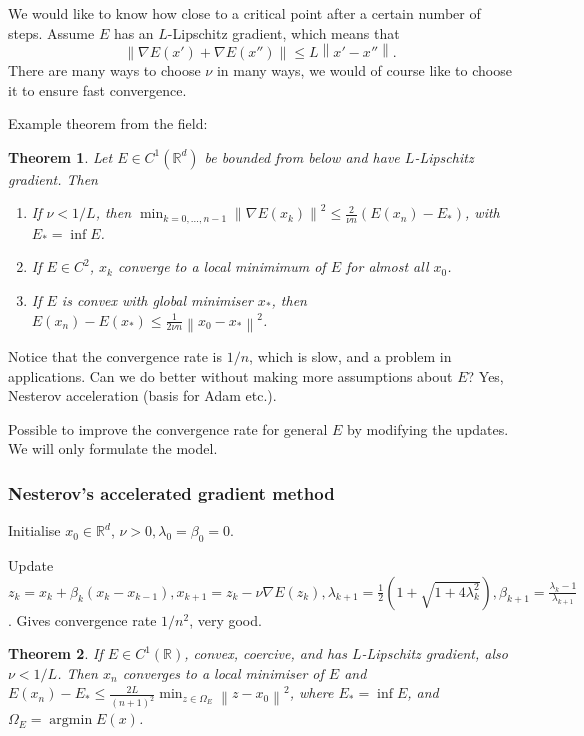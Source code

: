 \documentclass[12pt]{article}
\newtheorem{theorem}{Theorem}[section]
\theoremstyle{definition}
\newcommand{\real}{\mathbb{R}}   %
\DeclareMathOperator{\argmin}{argmin}
\newcommand\norm[1]{\left\lVert#1\right\rVert}
\begin{document}
We would like to know how close to a critical point after a certain number of steps. Assume $E$ has an $L$-Lipschitz gradient, which means that
\begin{equation*}
    \norm{\nabla E(x') + \nabla E(x'')} \leq L \norm{x'-x''}.
\end{equation*}
There are many ways to choose $\nu$ in many ways, we would of course like to choose it to ensure fast convergence. 

Example theorem from the field:
\begin{theorem}
    Let $E\in C^1(\real^d)$ be bounded from below and have $L$-Lipschitz gradient. Then
    \begin{enumerate}[label=(\alph*)]
        \item If $\nu<1/L$, then $\min_{k=0,\dots,n-1} \norm{\nabla E(x_k)}^2\leq \frac{2}{\nu n} (E(x_n)- E_*)$, with $E_* = \inf E$.
        \item If $E\in C^2$, $x_k$ converge to a local minimimum of $E$ for almost all $x_0$.
        \item If $E$ is convex with global minimiser $x_*$, then $E(x_n)-E(x_*)\leq \frac{1}{2\nu n} \norm{x_0-x_*}^2$.
    \end{enumerate}
\end{theorem}
Notice that the convergence rate is $1/n$, which is slow, and a problem in applications. Can we do better without making more assumptions about $E$? Yes, Nesterov acceleration (basis for Adam etc.). 

Possible to improve the convergence rate for general $E$ by modifying the updates. We will only formulate the model. 

\subsubsection{Nesterov's accelerated gradient method}
Initialise $x_0\in\real^d$, $\nu>0, \lambda_0=\beta_0=0$.

Update $z_k = x_k + \beta_k(x_k-x_{k-1}), x_{k+1} = z_k - \nu \nabla E(z_k), \lambda_{k+1} = \frac{1}{2}(1+\sqrt{1+4\lambda_k^2}), \beta_{k+1} = \frac{\lambda_{k}-1}{\lambda_{k+1}}$. Gives convergence rate $1/n^2$, very good.

\begin{theorem}
    If $E\in C^1(\real)$, convex, coercive, and has $L$-Lipschitz gradient, also $\nu<1/L$. Then $x_n$ converges to a local minimiser of $E$ and $E(x_n)- E_* \leq \frac{2 L}{(n+1)^2}\min_{z\in\Omega_E}\norm{z-x_0}^2$, where $E_*=\inf E$, and $\Omega_E = \argmin E(x)$. 
\end{theorem}
\end{document}
